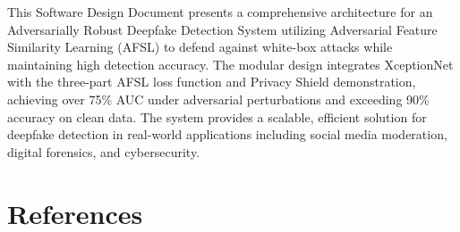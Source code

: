 \documentclass[a4paper,12pt]{article}
\begin{document}
This Software Design Document presents a comprehensive architecture for an Adversarially Robust Deepfake Detection System utilizing Adversarial Feature Similarity Learning (AFSL) to defend against white-box attacks while maintaining high detection accuracy. The modular design integrates XceptionNet with the three-part AFSL loss function and Privacy Shield demonstration, achieving over 75\% AUC under adversarial perturbations and exceeding 90\% accuracy on clean data. The system provides a scalable, efficient solution for deepfake detection in real-world applications including social media moderation, digital forensics, and cybersecurity.
\newpage
\section{References}
\end{document}
